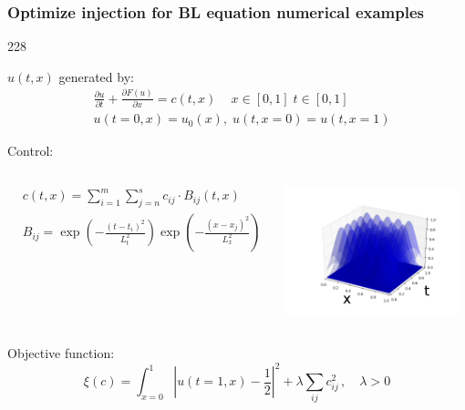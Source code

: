 \documentclass{beamer}
\newcommand{\barrow}{\item[\color{darkred}\ding{228}]}
\begin{document}
\begin{frame}
    \frametitle{Optimize injection for BL equation \hfill \scriptsize{numerical examples}} \small
    \begin{dinglist}{228}
    \barrow
    $u(t,x)$ generated by:
    \begin{equation*}\begin{split}
        &\frac{\partial u}{\partial t} + \frac{\partial F(u)}{\partial x} = c(t,x)\,
        \quad x\in[0,1]\; t\in[0,1]\\
        &u(t=0,x) =u_0(x),\; u(t,x=0)=u(t,x=1)
        \label{BL eqn}
    \end{split}\end{equation*}
    \barrow
    Control:
    \vspace{-.7cm}
    \begin{columns}
        \begin{equation*}\begin{split}
            &c(t,x) = \sum_{i=1}^m \sum_{j=n}^s c_{ij} \cdot B_{ij}(t,x)\\
            &B_{ij} = \exp\left(-\frac{(t-t_i)^2}{L_t^2}\right)
            \exp\left(-\frac{(x-x_j)^2}{L_x^2}\right)
        \end{split}\end{equation*}
        \begin{center}
            \includegraphics[width=5cm]{25controls.png}
        \end{center}
    \end{columns}
    \vspace{-.3cm}
    \barrow
    Objective function:
    \begin{equation*}
        \xi(c) = \int_{x=0}^1 \left| u(t=1,x) -  \frac{1}{2}\right|^2 + \lambda\sum_{ij} c_{ij}^2
        \,,
        \quad  \lambda > 0
        \label{BL obj fun}
    \end{equation*}
    \end{dinglist}
\end{frame}
\end{document}
